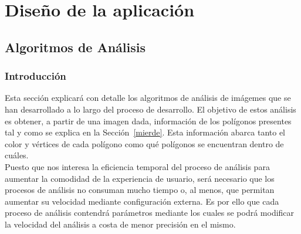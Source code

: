 \chapter{Diseño de la aplicación}
\section{Algoritmos de Análisis}

\subsection{Introducción}

Esta sección explicará con detalle los algoritmos de análisis de imágemes que se han desarrollado a lo largo del proceso de desarrollo. El objetivo de estos análisis es obtener, a partir de una imagen dada, información de los polígonos presentes tal y como se explica en la Sección~\ref{mierde}. Esta información abarca tanto el color y vértices de cada polígono como qué polígonos se encuentran dentro de cuáles.\\

Puesto que nos interesa la eficiencia temporal del proceso de análisis para aumentar la comodidad de la experiencia de usuario, será necesario que los procesos de análisis no consuman mucho tiempo o, al menos, que permitan aumentar su velocidad mediante configuración externa. Es por ello que cada proceso de análisis contendrá parámetros mediante los cuales se podrá modificar la velocidad del análisis a costa de menor precisión en el mismo.\\

